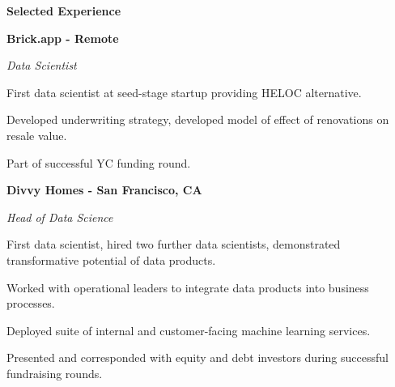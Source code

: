 \documentclass{res}
\begin{document}
{\begin{resume}
\begin{minipage}{7.6in}
\vspace{8mm}
\hrulefill\textbf{\hspace{2mm}Selected Experience\hspace{2mm}}\hrulefill
\vspace{3mm}




\textbf{Brick.app - Remote}

\vspace{0.75mm}
{\it Data Scientist}  
\vspace{0.5mm}
\begin{list}{}{\leftmargin=1em}\itemsep-2pt
\item First data scientist at seed-stage startup providing HELOC alternative.
\item Developed underwriting strategy, developed model of effect of renovations on resale value.
\item Part of successful YC funding round.
\end{list}

\vspace{3mm}
\textbf{Divvy Homes - San Francisco, CA}

\vspace{0.75mm}
{\it Head of Data Science}  
\vspace{0.5mm}
\begin{list}{}{\leftmargin=1em}\itemsep-2pt
\item First data scientist, hired two further data scientists, demonstrated transformative potential of data products.
\item Worked with operational leaders to integrate data products into business processes.
\item Deployed suite of internal and customer-facing machine learning services.
\item Presented and corresponded with equity and debt investors during successful fundraising rounds.
\end{list}


\end{minipage}
\end{resume}}
\end{document}
